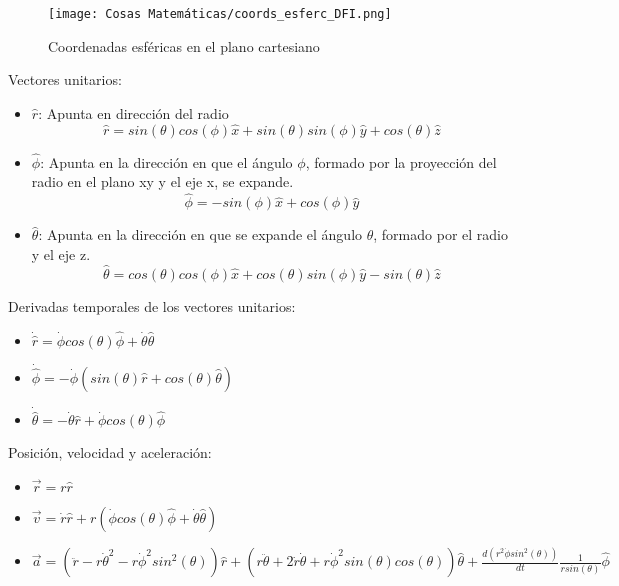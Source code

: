 \begin{figure}[H]
    \centering
    \texttt{[image: Cosas Matemáticas/coords\_esferc\_DFI.png]}
    \caption{Coordenadas esféricas en el plano cartesiano}
    \label{fig:C.esfericas}
\end{figure}

Vectores unitarios:

\begin{itemize}
    \item $\hat{r}$: Apunta en dirección del radio
        \[\hat{r} = sin(\theta)cos(\phi)\hat{x} + sin(\theta)sin(\phi)\hat{y} + cos(\theta)\hat{z}\]
    \item $\hat{\phi}$: Apunta en la dirección en que el ángulo $\phi$, formado por la proyección del radio en el plano xy y el eje x, se expande. %
        \[\hat{\phi} = -sin(\phi)\hat{x} + cos(\phi)\hat{y}\]
    \item $\hat{\theta}$: Apunta en la dirección en que se expande el ángulo $\theta$, formado por el radio y el eje z. %
        \[\hat{\theta} = cos(\theta)cos(\phi)\hat{x} + cos(\theta)sin(\phi)\hat{y}-sin(\theta)\hat{z}\]
\end{itemize}

\medbreak

Derivadas temporales de los vectores unitarios:

\begin{itemize}
    \item $\dot{\hat{r}} = \dot{\phi}cos(\theta)\hat{\phi}+\dot{\theta}\hat{\theta}$
    \item $\dot{\hat{\phi}} = -\dot{\phi}(sin(\theta)\hat{r}+cos(\theta)\hat{\theta})$
    \item $\dot{\hat{\theta}} = -\dot{\theta}\hat{r}+\dot{\phi}cos(\theta)\hat{\phi}$
\end{itemize}

\medbreak

Posición, velocidad y aceleración:

\begin{itemize}
    \item $\vec{r} = r\hat{r}$
    \item $\vec{v} = \dot{r}\hat{r} + r(\dot{\phi}cos(\theta)\hat{\phi}+\dot{\theta}\hat{\theta})$
    \item $\vec{a} = (\ddot{r}-r\dot{\theta}^2-r\dot{\phi}^2sin^2(\theta))\hat{r} + (r\ddot{\theta}+2\dot{r}\dot{\theta}+r\dot{\phi}^2sin(\theta)cos(\theta))\hat{\theta} + \frac{d(r^2\dot{\phi}sin^2(\theta))}{dt}\frac{1}{rsin(\theta)}\hat{\phi}$
\end{itemize}

